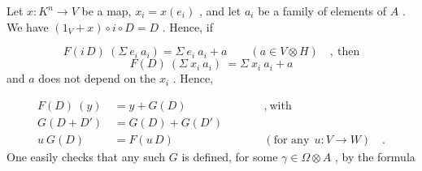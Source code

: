 \begin{center}
\end{center}
Let  $x : K^{n} \rightarrow V$  be a map,  $x_{i} = x(e_{i})$  , and let  $a_{i}$  be a family of elements of  $A$  . We have  $(1_{V} + x) \circ i \circ D = D$  . Hence, if

\begin{equation*}
F(i\,D)\ (\Sigma\ e_{i}\ a_{i}) = \Sigma\ e_{i}\ a_{i} + a \qquad (a \in V \otimes H) \quad , \ \text{then}
\end{equation*}
\begin{equation*}
F(D)\ (\Sigma\ x_{i}\ a_{i}) \ = \Sigma\ x_{i}\ a_{i} + a
\end{equation*}
and  $a$  does not depend on the  $x_{i}$  . Hence,

\begin{equation*}
\begin{aligned}
F(D)\ (y) \ &= y + G(D) &&\qquad , \ \text{with} \\
G(D + D') &= G(D) + G(D') & \\
u\ G(D) \quad &= F(u\,D) &&\qquad (\text{for any} \ \ u : V \rightarrow W) \quad .
\end{aligned}
\end{equation*}
One easily checks that any such  $G$  is defined, for some  $\gamma \in \Omega \otimes A$  , by the formula

